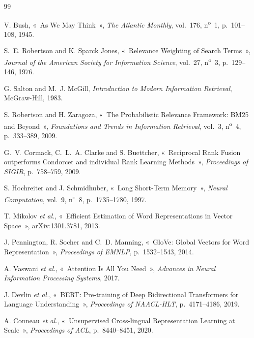 \begin{thebibliography}{99}

V. Bush,
«~As We May Think~»,
\emph{The Atlantic Monthly}, vol.~176, n\textsuperscript{o}~1, p.~101--108, 1945.

S.~E. Robertson and K. Sparck Jones,
«~Relevance Weighting of Search Terms~»,
\emph{Journal of the American Society for Information Science},
vol.~27, n\textsuperscript{o}~3, p.~129--146, 1976.

G. Salton and M.~J. McGill,
\emph{Introduction to Modern Information Retrieval},
McGraw-Hill, 1983.

S. Robertson and H. Zaragoza,
«~The Probabilistic Relevance Framework: BM25 and Beyond~»,
\emph{Foundations and Trends in Information Retrieval},
vol.~3, n\textsuperscript{o}~4, p.~333--389, 2009.

G.~V. Cormack, C.~L.~A. Clarke and S. Buettcher,
«~Reciprocal Rank Fusion outperforms Condorcet and individual Rank Learning Methods~»,
\emph{Proceedings of SIGIR}, p.~758--759, 2009.

S. Hochreiter and J. Schmidhuber,
«~Long Short-Term Memory~»,
\emph{Neural Computation}, vol.~9, n\textsuperscript{o}~8, p.~1735--1780, 1997.

T. Mikolov \textit{et al.},
«~Efficient Estimation of Word Representations in Vector Space~»,
arXiv:1301.3781, 2013.

J. Pennington, R. Socher and C.~D. Manning,
«~GloVe: Global Vectors for Word Representation~»,
\emph{Proceedings of EMNLP}, p.~1532--1543, 2014.

A. Vaswani \textit{et al.},
«~Attention Is All You Need~»,
\emph{Advances in Neural Information Processing Systems}, 2017.

J. Devlin \textit{et al.},
«~BERT: Pre-training of Deep Bidirectional Transformers for Language Understanding~»,
\emph{Proceedings of NAACL-HLT}, p.~4171--4186, 2019.

A. Conneau \textit{et al.},
«~Unsupervised Cross-lingual Representation Learning at Scale~»,
\emph{Proceedings of ACL}, p.~8440--8451, 2020.


\end{thebibliography}
